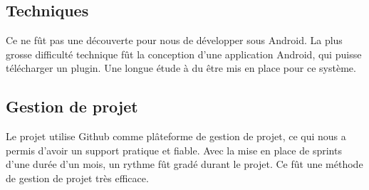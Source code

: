 \subsection{Techniques}
Ce ne f\^{u}t pas une découverte pour nous de développer sous Android. La plus grosse difficulté technique fût la conception d'une application Android, qui puisse télécharger un plugin. Une longue étude à du être mis en place pour ce système.

\subsection{Gestion de projet}
Le projet utilise Github comme plâteforme de gestion de projet, ce qui nous a permis d'avoir un support pratique et fiable. Avec la mise en place de sprints d'une durée d'un mois, un rythme f\^{u}t gradé durant le projet. Ce f\^{u}t une méthode de gestion de projet très efficace.